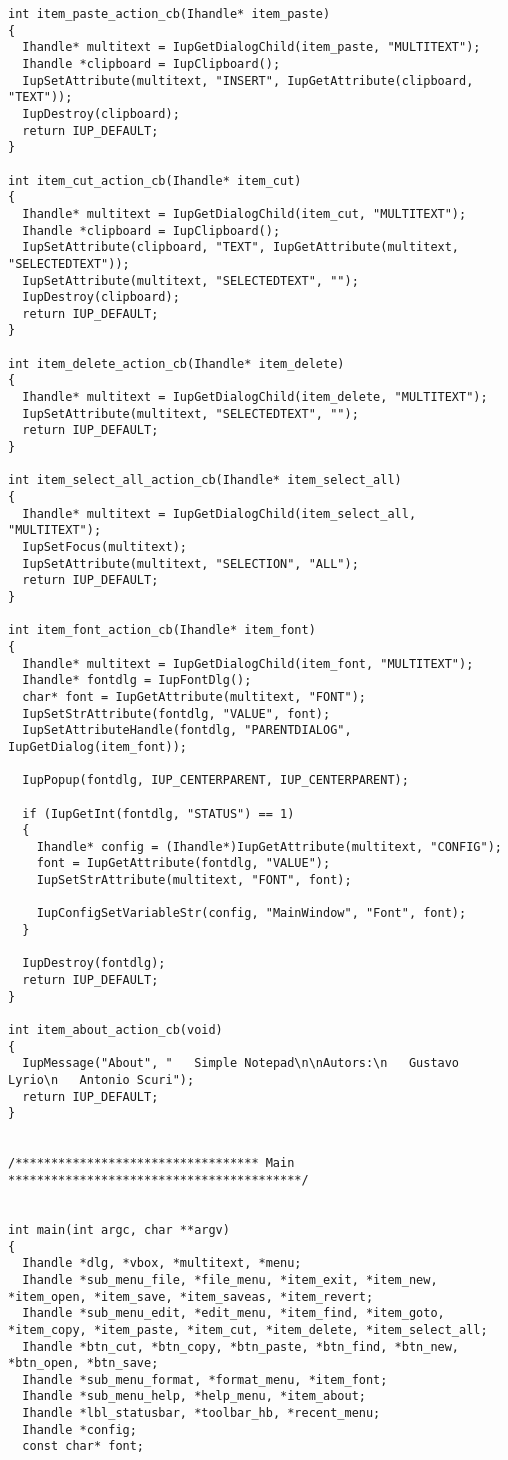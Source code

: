 \documentclass{ctexart}
\begin{document}
\begin{lstlisting}
int item_paste_action_cb(Ihandle* item_paste) 
{
  Ihandle* multitext = IupGetDialogChild(item_paste, "MULTITEXT");
  Ihandle *clipboard = IupClipboard();
  IupSetAttribute(multitext, "INSERT", IupGetAttribute(clipboard, "TEXT"));
  IupDestroy(clipboard);
  return IUP_DEFAULT;
}

int item_cut_action_cb(Ihandle* item_cut) 
{
  Ihandle* multitext = IupGetDialogChild(item_cut, "MULTITEXT");
  Ihandle *clipboard = IupClipboard();
  IupSetAttribute(clipboard, "TEXT", IupGetAttribute(multitext, "SELECTEDTEXT"));
  IupSetAttribute(multitext, "SELECTEDTEXT", "");
  IupDestroy(clipboard);
  return IUP_DEFAULT;
}

int item_delete_action_cb(Ihandle* item_delete) 
{
  Ihandle* multitext = IupGetDialogChild(item_delete, "MULTITEXT");
  IupSetAttribute(multitext, "SELECTEDTEXT", "");
  return IUP_DEFAULT;
}

int item_select_all_action_cb(Ihandle* item_select_all) 
{
  Ihandle* multitext = IupGetDialogChild(item_select_all, "MULTITEXT");
  IupSetFocus(multitext);
  IupSetAttribute(multitext, "SELECTION", "ALL");
  return IUP_DEFAULT;
}

int item_font_action_cb(Ihandle* item_font)
{
  Ihandle* multitext = IupGetDialogChild(item_font, "MULTITEXT");
  Ihandle* fontdlg = IupFontDlg();
  char* font = IupGetAttribute(multitext, "FONT");
  IupSetStrAttribute(fontdlg, "VALUE", font);
  IupSetAttributeHandle(fontdlg, "PARENTDIALOG", IupGetDialog(item_font));

  IupPopup(fontdlg, IUP_CENTERPARENT, IUP_CENTERPARENT);

  if (IupGetInt(fontdlg, "STATUS") == 1)
  {
    Ihandle* config = (Ihandle*)IupGetAttribute(multitext, "CONFIG");
    font = IupGetAttribute(fontdlg, "VALUE");
    IupSetStrAttribute(multitext, "FONT", font);

    IupConfigSetVariableStr(config, "MainWindow", "Font", font);
  }

  IupDestroy(fontdlg);
  return IUP_DEFAULT;
}

int item_about_action_cb(void)
{
  IupMessage("About", "   Simple Notepad\n\nAutors:\n   Gustavo Lyrio\n   Antonio Scuri");
  return IUP_DEFAULT;
}


/********************************** Main *****************************************/


int main(int argc, char **argv)
{
  Ihandle *dlg, *vbox, *multitext, *menu;
  Ihandle *sub_menu_file, *file_menu, *item_exit, *item_new, *item_open, *item_save, *item_saveas, *item_revert;
  Ihandle *sub_menu_edit, *edit_menu, *item_find, *item_goto, *item_copy, *item_paste, *item_cut, *item_delete, *item_select_all;
  Ihandle *btn_cut, *btn_copy, *btn_paste, *btn_find, *btn_new, *btn_open, *btn_save;
  Ihandle *sub_menu_format, *format_menu, *item_font;
  Ihandle *sub_menu_help, *help_menu, *item_about;
  Ihandle *lbl_statusbar, *toolbar_hb, *recent_menu;
  Ihandle *config;
  const char* font;


\end{lstlisting}
\end{document}

